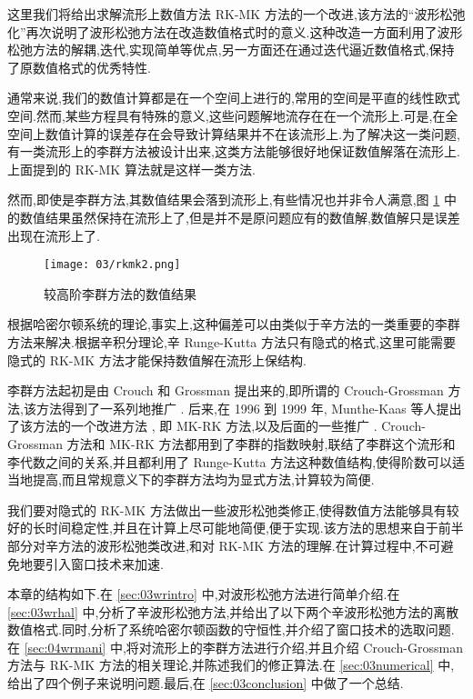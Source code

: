 这里我们将给出求解流形上数值方法 RK-MK \cite{arieh2005liegroup} 方法的一个改进,该方法的``波形松弛化''再次说明了波形松弛方法在改造数值格式时的意义.这种改造一方面利用了波形松弛方法的解耦,迭代,实现简单等优点,另一方面还在通过迭代逼近数值格式,保持了原数值格式的优秀特性.

通常来说,我们的数值计算都是在一个空间上进行的,常用的空间是平直的线性欧式空间.然而,某些方程具有特殊的意义,这些问题解地流存在在一个流形上.可是,在全空间上数值计算的误差存在会导致计算结果并不在该流形上.为了解决这一类问题,有一类流形上的李群方法被设计出来,这类方法能够很好地保证数值解落在流形上.上面提到的 RK-MK 算法就是这样一类方法.

然而,即使是李群方法,其数值结果会落到流形上,有些情况也并非令人满意,图 \ref{fig:rkmk2} 中的数值结果虽然保持在流形上了,但是并不是原问题应有的数值解,数值解只是误差出现在流形上了.
\begin{figure}[h!]
  \centering
  \texttt{[image: 03/rkmk2.png]}
  \caption{较高阶李群方法的数值结果}
  \label{fig:rkmk2}
\end{figure}

根据哈密尔顿系统的理论,事实上,这种偏差可以由类似于辛方法的一类重要的李群方法来解决.根据辛积分理论,辛 Runge-Kutta 方法只有隐式的格式,这里可能需要隐式的 RK-MK 方法才能保持数值解在流形上保结构.

李群方法起初是由 Crouch 和 Grossman \cite{crouch1993numerical} 提出来的,即所谓的 Crouch-Grossman 方法,该方法得到了一系列地推广 \cite{faleinsen2001multi,zaletkin2010numerical,bulychev2001numerical,buono2003numerical,billo1992numerical}. 后来,在 1996 到 1999 年, Munthe-Kaas  等人提出了该方法的一个改进方法 \cite{mk1996lie,mk1997numerical,mk1998runge,mk1999high}, 即 MK-RK 方法,以及后面的一些推广 \cite{ostermann2010exponential,owren2000the,bruls2012lie,munthe2013onpost,garcla2011onalg}. Crouch-Grossman 方法和 MK-RK 方法都用到了李群的指数映射,联结了李群这个流形和李代数之间的关系,并且都利用了 Runge-Kutta 方法这种数值结构,使得阶数可以适当地提高,而且常规意义下的李群方法均为显式方法,计算较为简便.

我们要对隐式的 RK-MK 方法做出一些波形松弛类修正,使得数值方法能够具有较好的长时间稳定性,并且在计算上尽可能地简便,便于实现.该方法的思想来自于前半部分对辛方法的波形松弛类改进,和对 RK-MK 方法的理解.在计算过程中,不可避免地要引入窗口技术来加速.

本章的结构如下.在 \ref{sec:03wrintro} 中,对波形松弛方法进行简单介绍.在 \ref{sec:03wrhal} 中,分析了辛波形松弛方法,并给出了以下两个辛波形松弛方法的离散数值格式.同时,分析了系统哈密尔顿函数的守恒性,并介绍了窗口技术的选取问题.在 \ref{sec:04wrmani} 中,将对流形上的李群方法进行介绍,并且介绍 Crouch-Grossman 方法与 RK-MK 方法的相关理论,并陈述我们的修正算法.在 \ref{sec:03numerical} 中,给出了四个例子来说明问题.最后,在 \ref{sec:03conclusion} 中做了一个总结.

